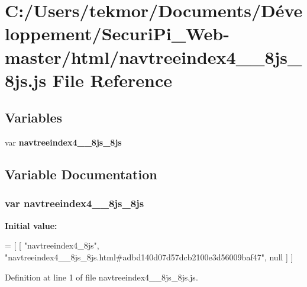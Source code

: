 \section{C\+:/\+Users/tekmor/\+Documents/\+Développement/\+Securi\+Pi\+\_\+\+Web-\/master/html/navtreeindex4\+\_\+\+\_\+8js\+\_\+8js.js File Reference}
\label{navtreeindex4____8js__8js_8js}
\subsection*{Variables}
\begin{DoxyCompactItemize}
\item 
var {\bf navtreeindex4\+\_\+\+\_\+8js\+\_\+8js}
\end{DoxyCompactItemize}


\subsection{Variable Documentation}
\subsubsection[{navtreeindex4\+\_\+\+\_\+8js\+\_\+8js}]{\setlength{\rightskip}{0pt plus 5cm}var navtreeindex4\+\_\+\+\_\+8js\+\_\+8js}\label{navtreeindex4____8js__8js_8js_a1dc6cf88499fbf30496d14f4d8189244}
{\bfseries Initial value\+:}
\begin{DoxyCode}
=
[
    [ \textcolor{stringliteral}{"navtreeindex4\_8js"}, \textcolor{stringliteral}{"navtreeindex4\_\_8js\_8js.html#adbd140d07d57dcb2100e3d56009baf47"}, null ]
]
\end{DoxyCode}


Definition at line 1 of file navtreeindex4\+\_\+\+\_\+8js\+\_\+8js.\+js.

